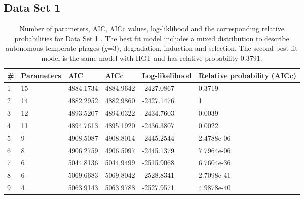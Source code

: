   \subsection{Data Set 1}
  \begin{table}[hbt!]
\centering
\begin{tabular}{ p{1cm}p{2cm}p{2cm}p{2cm}p{2cm}p{3cm}  }
\hline
\# & Parameters & AIC & AICc& Log-likelihood & Relative probability (AICc) \\
\hline
1&                        15&          4884.1734&          4884.9642&         -2427.0867&         0.3719\\
2&                        14&          4882.2952&          4882.9860&         -2427.1476&         1\\
3&                        12&          4893.5207&          4894.0322&         -2434.7603&       0.0039\\
4&                        11&          4894.7613&          4895.1920&         -2436.3807&       0.0022\\
5&                         9&          4908.5087&          4908.8014&         -2445.2544&      2.4788e-06\\
6&                         8&          4906.2759&          4906.5097&         -2445.1379&      7.7964e-06\\
7&                         6&          5044.8136&          5044.9499&         -2515.9068&      6.7604e-36\\
8&                         6&          5069.6683&          5069.8042&         -2528.8341&      2.7098e-41\\
9&                         4&          5063.9143&          5063.9788&         -2527.9571&      4.9878e-40\\
\hline
\end{tabular}
\caption[Number of parameters, AIC, AICc values, log-liklihood and the corresponding relative probabilities for Data Set 1.]{Number of parameters, AIC, AICc values, log-liklihood and the corresponding relative probabilities for Data Set 1 \citep{bobay_pervasive_2014}. The best fit model includes a mixed distribution to describe autonomous temperate phages ($g$=3), degradation, induction and selection. The second best fit model is the same model with HGT and has relative probability $0.3791$.}
\label{table:bob}
\end{table}
\newpage
